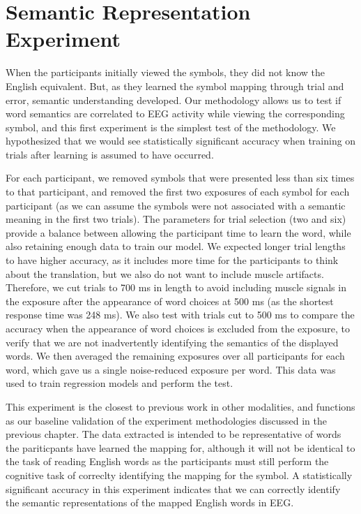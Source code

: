 \section{Semantic Representation Experiment}
\label{sec:experiments:semanticrepresentation}
When the participants initially viewed the symbols, they did not know the 
English equivalent. But, as they learned the symbol mapping through trial and 
error, semantic understanding developed. Our methodology allows us to test if 
word semantics are correlated to EEG activity while viewing the corresponding 
symbol, and this first experiment is the simplest test of the methodology. We 
hypothesized that we would see statistically significant accuracy when training 
on trials after learning is assumed to have occurred.

For each participant, we removed symbols that were presented less than six 
times to that participant, and removed the first two exposures of each symbol 
for each participant (as we can assume the symbols were not associated with a 
semantic meaning in the first two trials). The parameters for trial selection 
(two and six) provide a balance between allowing the participant time to learn 
the word, while also retaining enough data to train our model. We expected 
longer trial lengths to have higher accuracy, as it includes more time for the 
participants to think about the translation, but we also do not want to include 
muscle artifacts. Therefore, we cut trials to 700 ms in length to avoid 
including muscle signals in the exposure after the appearance of word choices 
at 500 ms (as the shortest response time was 248 ms).  We also test with trials 
cut to 500 ms to compare the \tvt accuracy when the appearance of word choices 
is excluded from the exposure, to verify that we are not inadvertently 
identifying the semantics of the displayed words.  We then averaged the 
remaining exposures over all participants for each word, which gave us a single 
noise-reduced exposure per word. This data was used to train regression models 
and perform the \tvt test. 

This experiment is the closest to previous work in other modalities, and 
functions as our baseline validation of the experiment methodologies discussed 
in the previous chapter. The data extracted is intended to be representative of 
words the pariticpants have learned the mapping for, although it will not be 
identical to the task of reading English words as the participants must still 
perform the cognitive task of correclty identifying the mapping for the symbol.  
A statistically significant \tvt accuracy in this experiment indicates that we 
can correctly identify the semantic representations of the mapped English words 
in EEG.
